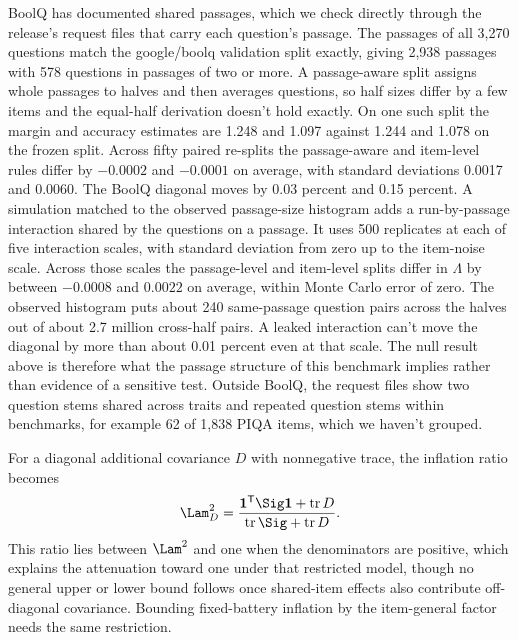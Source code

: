 BoolQ has documented shared passages, which we check directly through the release's request files that carry each question's passage. The passages of all 3,270 questions match the google/boolq validation split exactly, giving 2,938 passages with 578 questions in passages of two or more. A passage-aware split assigns whole passages to halves and then averages questions, so half sizes differ by a few items and the equal-half derivation doesn't hold exactly. On one such split the margin and accuracy estimates are 1.248 and 1.097 against 1.244 and 1.078 on the frozen split. Across fifty paired re-splits the passage-aware and item-level rules differ by $-0.0002$ and $-0.0001$ on average, with standard deviations 0.0017 and 0.0060. The BoolQ diagonal moves by 0.03 percent and 0.15 percent. A simulation matched to the observed passage-size histogram adds a run-by-passage interaction shared by the questions on a passage. It uses 500 replicates at each of five interaction scales, with standard deviation from zero up to the item-noise scale. Across those scales the passage-level and item-level splits differ in $\Lambda$ by between $-0.0008$ and $0.0022$ on average, within Monte Carlo error of zero. The observed histogram puts about 240 same-passage question pairs across the halves out of about 2.7 million cross-half pairs. A leaked interaction can't move the diagonal by more than about 0.01 percent even at that scale. The null result above is therefore what the passage structure of this benchmark implies rather than evidence of a sensitive test. Outside BoolQ, the request files show two question stems shared across traits and repeated question stems within benchmarks, for example 62 of 1,838 PIQA items, which we haven't grouped.

For a diagonal additional covariance $D$ with nonnegative trace, the inflation ratio becomes
\begin{equation}
\Lam_D^2=\frac{\mathbf1^{\mathsf T}\Sig\mathbf1+\operatorname{tr}D}
{\operatorname{tr}\Sig+\operatorname{tr}D}. \end{equation}
This ratio lies between $\Lam^2$ and one when the denominators are positive, which explains the attenuation toward one under that restricted model, though no general upper or lower bound follows once shared-item effects also contribute off-diagonal covariance. Bounding fixed-battery inflation by the item-general factor needs the same restriction.

